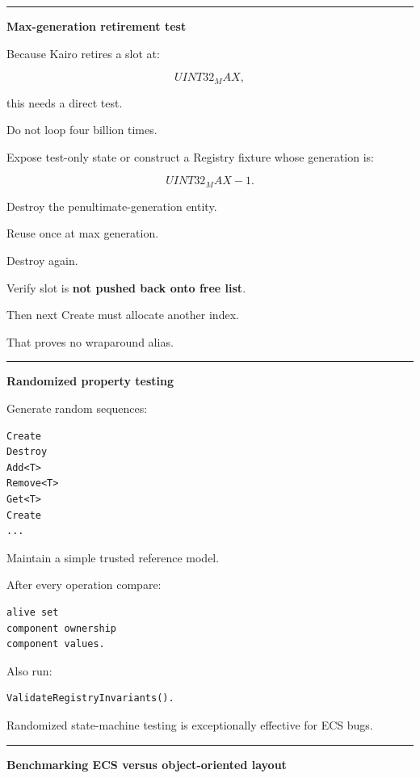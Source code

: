 \begin{center}\rule{0.5\linewidth}{0.5pt}\end{center}

\textbf{Max-generation retirement test}

Because Kairo retires a slot at:

\[
UINT32_MAX,
\]

this needs a direct test.

Do not loop four billion times.

Expose test-only state or construct a Registry fixture whose generation is:

\[
UINT32_MAX-1.
\]

Destroy the penultimate-generation entity.

Reuse once at max generation.

Destroy again.

Verify slot is \textbf{not pushed back onto free list}.

Then next Create must allocate another index.

That proves no wraparound alias.

\begin{center}\rule{0.5\linewidth}{0.5pt}\end{center}

\textbf{Randomized property testing}

Generate random sequences:

\begin{verbatim}
Create
Destroy
Add<T>
Remove<T>
Get<T>
Create
...
\end{verbatim}

Maintain a simple trusted reference model.

After every operation compare:

\begin{verbatim}
alive set
component ownership
component values.
\end{verbatim}

Also run:

\begin{verbatim}
ValidateRegistryInvariants().
\end{verbatim}

Randomized state-machine testing is exceptionally effective for ECS bugs.

\begin{center}\rule{0.5\linewidth}{0.5pt}\end{center}

\textbf{Benchmarking ECS versus object-oriented layout}

